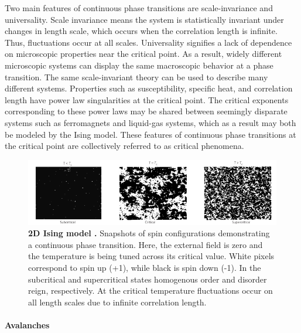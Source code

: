 \documentclass[12pt]{article}
\begin{document}
Two main features of continuous phase transitions are scale-invariance and universality. Scale invariance means the system is statistically invariant under changes in length scale, which occurs when the correlation length is infinite. Thus, fluctuations occur at all scales. Universality signifies a lack of dependence on microscopic properties near the critical point. As a result, widely different microscopic systems can display the same macroscopic behavior at a phase transition. The same scale-invariant theory can be used to describe many different systems. Properties such as susceptibility, specific heat, and correlation length have power law singularities at the critical point. The critical exponents corresponding to these power laws  may be shared between seemingly disparate systems such as ferromagnets and liquid-gas systems, which as a result may both be modeled by the Ising model. These features of continuous phase transitions at the critical point are collectively referred to as critical phenomena.

\begin{figure}      
  \begin{center}    
 \includegraphics[width=1\textwidth]{Isingchialvo}    
    \caption{\textbf{2D Ising model \cite{Chialvo2010a}.} Snapshots of spin configurations demonstrating a continuous phase transition. Here, the external field is zero and the temperature is being tuned across its critical value. White pixels correspond to spin up (+1), while black is spin down (-1). In the subcritical and supercritical states homogenous order and disorder reign, respectively. At the critical temperature fluctuations occur on all length scales due to infinite correlation length.}  
   \label{Figure::Ising model criticality}   
  \end{center}     
   \end{figure}
 
\paragraph*{Avalanches}
\end{document}
